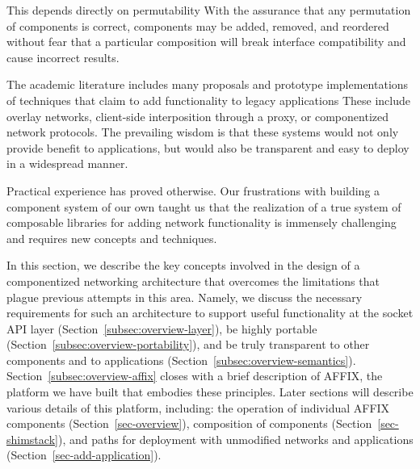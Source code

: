This depends directly on permutability
With the assurance that any permutation of components
is correct, components may be added, removed, and reordered
without fear that a particular composition
will break interface compatibility and cause incorrect results.







\iffalse

The academic literature includes many proposals and prototype implementations 
of techniques that claim to add functionality to legacy applications 
These include overlay networks, client-side interposition through a proxy, or 
componentized network protocols. The prevailing wisdom is that 
these systems would not only provide benefit to applications, but would 
also be transparent and easy to deploy in a widespread manner.

Practical experience has proved otherwise. Our frustrations with building a 
component system of our own taught us that the realization of a true system 
of composable libraries for adding network functionality is immensely challenging 
and requires new concepts and techniques. 

In this section, we describe the key concepts involved in the design of 
a componentized networking architecture that overcomes 
the limitations that plague previous attempts in this area.
Namely, we discuss the necessary requirements for such an architecture to
support useful functionality at the socket API layer (Section~\ref{subsec:overview-layer}), 
be highly portable (Section~\ref{subsec:overview-portability}),
and be truly transparent to other components and to applications 
(Section~\ref{subsec:overview-semantics}).
Section~\ref{subsec:overview-affix} closes
with a brief description of AFFIX, the platform we have built that embodies these principles.
Later sections will 
describe various details of this platform, including: 
the operation of individual AFFIX components (Section~\ref{sec-overview}), 
composition of components (Section~\ref{sec-shimstack}),
and paths for deployment with 
unmodified networks and applications (Section~\ref{sec-add-application}).


